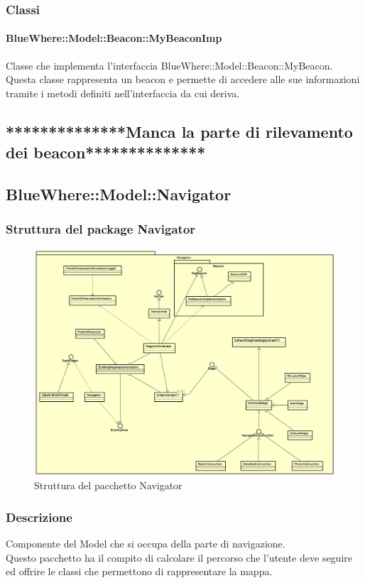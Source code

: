 \documentclass[../SpecificaTecnica.tex]{subfiles}
\begin{document}
		\subsubsection{Classi}
			\paragraph{BlueWhere::Model::Beacon::MyBeaconImp}
				Classe che implementa l'interfaccia BlueWhere::Model::Beacon::MyBeacon. \\
				Questa classe rappresenta un beacon e permette di accedere alle sue informazioni tramite i metodi definiti nell'interfaccia da cui deriva.
	\subsection{**************Manca la parte di rilevamento dei beacon**************}
	\newpage
	\subsection{BlueWhere::Model::Navigator}
		\subsubsection{Struttura del package Navigator}
		\begin{figure}[!h]
			\centering
			\includegraphics[scale=0.3]{diagrammi/Navigator.png}
				\caption{Struttura del pacchetto Navigator}
			\label{fig:Struttura_MVP}
		\end{figure} 
		\subsubsection{Descrizione}
			Componente del Model che si occupa della parte di navigazione. \\
			Questo pacchetto ha il compito di calcolare il percorso che l'utente deve seguire ed offrire le classi che permettono di rappresentare la mappa.
\end{document}
